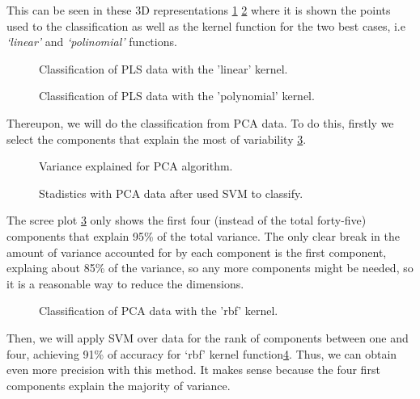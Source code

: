 This can be seen in these 3D representations \ref{fig:Classification3D_PLS_linear} \ref{fig:Classification3D_PLS_poly} where it is shown the points used to the classification as well as the kernel function for the two best cases, i.e \textit{‘linear’} and \textit{‘polinomial’} functions.

\begin{figure}[H]
	\centering
	\caption{Classification of PLS data with the 'linear' kernel.}
	\label{fig:Classification3D_PLS_linear}
\end{figure}

\begin{figure}[H]
	\centering
	\caption{Classification of PLS data with the 'polynomial' kernel.}
	\label{fig:Classification3D_PLS_poly}
\end{figure}

Thereupon, we will do the classification from PCA data. To do this, firstly we select the components that explain the most of variability \ref{fig:variance_PCA}.

\begin{figure}[H]
	\centering
	\caption{Variance explained for PCA algorithm.}
	\label{fig:variance_PCA}
\end{figure} 

\begin{figure}[H]
	\centering
	\caption{Stadistics with PCA data after used SVM to classify.}
	\label{fig:stadistics_PCA}
	\end{figure}
	
The scree plot \ref{fig:variance_PCA} only shows the first four (instead of the total forty-five) components that explain 95\% of the total variance. The only clear break in the amount of variance accounted for by each component is the first component, explaing about 85\% of the variance, so any more components might be needed, so it is  a reasonable way to reduce the dimensions.
\begin{figure}[H]
	\centering
	\caption{Classification of PCA data with the 'rbf' kernel.}
	\label{fig:Classification3D_PCA_rbf}
\end{figure}


Then, we will apply SVM over data for the rank of components between one and four, achieving 91\% of accuracy for ‘rbf’ kernel function\ref{fig:stadistics_PCA}. Thus, we can obtain even more precision with this method. It makes sense because the four first components explain the majority of variance.

